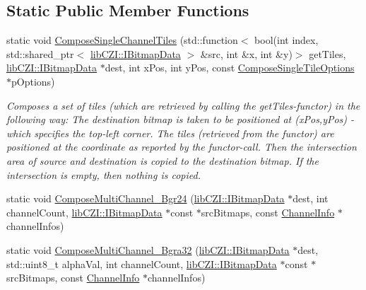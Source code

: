 \subsection*{Static Public Member Functions}
\begin{DoxyCompactItemize}
\item 
static void \hyperlink{classlib_c_z_i_1_1_compositors_a8b39ab77c8b83a5a5a8a7e1773e8ad7a}{Compose\+Single\+Channel\+Tiles} (std\+::function$<$ bool(int index, std\+::shared\+\_\+ptr$<$ \hyperlink{classlib_c_z_i_1_1_i_bitmap_data}{lib\+C\+Z\+I\+::\+I\+Bitmap\+Data} $>$ \&src, int \&x, int \&y)$>$ get\+Tiles, \hyperlink{classlib_c_z_i_1_1_i_bitmap_data}{lib\+C\+Z\+I\+::\+I\+Bitmap\+Data} $\ast$dest, int x\+Pos, int y\+Pos, const \hyperlink{structlib_c_z_i_1_1_compositors_1_1_compose_single_tile_options}{Compose\+Single\+Tile\+Options} $\ast$p\+Options)
\begin{DoxyCompactList}\small\item\em Composes a set of tiles (which are retrieved by calling the get\+Tiles-\/functor) in the following way\+: The destination bitmap is taken to be positioned at (x\+Pos,y\+Pos) -\/ which specifies the top-\/left corner. The tiles (retrieved from the functor) are positioned at the coordinate as reported by the functor-\/call. Then the intersection area of source and destination is copied to the destination bitmap. If the intersection is empty, then nothing is copied. \end{DoxyCompactList}\item 
static void \hyperlink{classlib_c_z_i_1_1_compositors_ab9be96d1b2b2e48c60c4dbf967e593c1}{Compose\+Multi\+Channel\+\_\+\+Bgr24} (\hyperlink{classlib_c_z_i_1_1_i_bitmap_data}{lib\+C\+Z\+I\+::\+I\+Bitmap\+Data} $\ast$dest, int channel\+Count, \hyperlink{classlib_c_z_i_1_1_i_bitmap_data}{lib\+C\+Z\+I\+::\+I\+Bitmap\+Data} $\ast$const $\ast$src\+Bitmaps, const \hyperlink{structlib_c_z_i_1_1_compositors_1_1_channel_info}{Channel\+Info} $\ast$channel\+Infos)
\item 
static void \hyperlink{classlib_c_z_i_1_1_compositors_a085b925190957b34943d22894a22fe13}{Compose\+Multi\+Channel\+\_\+\+Bgra32} (\hyperlink{classlib_c_z_i_1_1_i_bitmap_data}{lib\+C\+Z\+I\+::\+I\+Bitmap\+Data} $\ast$dest, std\+::uint8\+\_\+t alpha\+Val, int channel\+Count, \hyperlink{classlib_c_z_i_1_1_i_bitmap_data}{lib\+C\+Z\+I\+::\+I\+Bitmap\+Data} $\ast$const $\ast$src\+Bitmaps, const \hyperlink{structlib_c_z_i_1_1_compositors_1_1_channel_info}{Channel\+Info} $\ast$channel\+Infos)
\item 

\end{DoxyCompactItemize}
